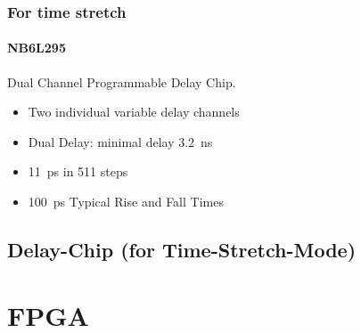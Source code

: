 \subsubsection{For time stretch}
\paragraph{NB6L295}
Dual Channel Programmable Delay Chip.

\begin{itemize}
	\item Two individual variable delay channels
	\item Dual Delay: minimal delay \SI{3.2}{\nano \second}
	\item \SI{11}{\pico \second} in 511 steps
	\item \SI{100}{\pico \second} Typical Rise and Fall Times
\end{itemize}
\subsection{Delay-Chip (for Time-Stretch-Mode)}
\newpage
\section{FPGA}
